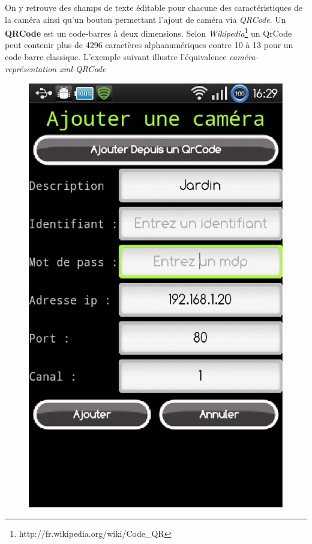 On y retrouve des champs de texte éditable pour chacune
des caractéristiques de la caméra ainsi qu'un bouton permettant l'ajout de caméra via \textit{QRCode}.\newline
Un \textbf{QRCode} est un code-barres à deux dimensions. Selon
\textit{Wikipedia}\footnote{\label{zxing}http://fr.wikipedia.org/wiki/Code\_QR}
un QrCode peut contenir plus de 4296 caractères alphanumériques contre 10 à 13 pour
un code-barre classique.\newline
L'exemple suivant illustre l'équivalence \textit{caméra-représentation
xml-QRCode}\newline
\begin{figure}[H]
  \centering
  \includegraphics[scale=0.4]{Images/addCam.eps}

\end{figure}
